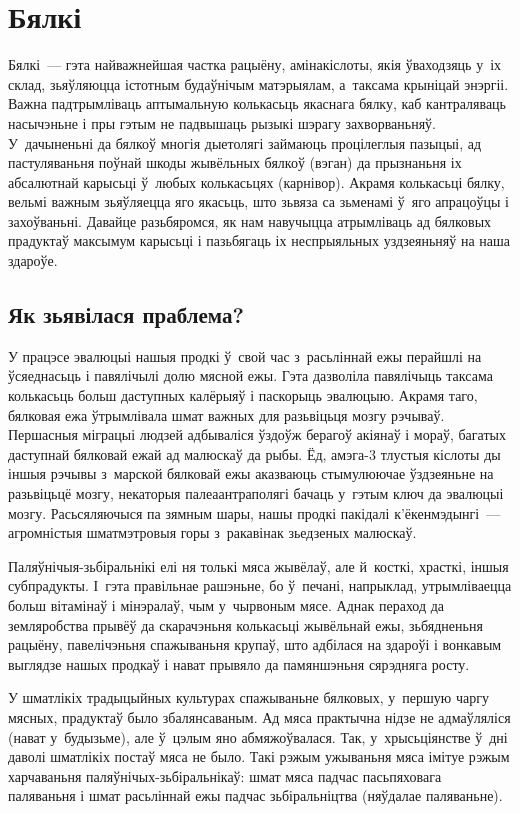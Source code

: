 \chapter{Бялкі}

Бялкі~--- гэта найважнейшая частка рацыёну, амінакіслоты, якія ўваходзяць у~іх склад, зьяўляюцца істотным будаўнічым матэрыялам, а~таксама крыніцай энэргіі. Важна падтрымліваць аптымальную колькасьць якаснага бялку, каб кантраляваць насычэньне і пры гэтым не падвышаць рызыкі шэрагу захворваньняў. У~дачыненьні да бялкоў многія дыетолягі займаюць процілеглыя пазыцыі, ад пастуляваньня поўнай шкоды жывёльных бялкоў (вэган) да прызнаньня іх абсалютнай карысьці ў~любых колькасьцях (карнівор). Акрамя колькасьці бялку, вельмі важным зьяўляецца яго якасьць, што зьвяза са зьменамі ў~яго апрацоўцы і захоўваньні. Давайце разьбяромся, як нам навучыцца атрымліваць ад бялковых прадуктаў максымум карысьці і пазьбягаць іх неспрыяльных уздзеяньняў на наша здароўе.

\section{Як зьявілася праблема?}

У працэсе эвалюцыі нашыя продкі ў~свой час з~расьліннай ежы перайшлі на ўсяеднасьць і павялічылі долю мясной ежы. Гэта дазволіла павялічыць таксама колькасьць больш даступных калёрыяў і паскорыць эвалюцыю. Акрамя таго, бялковая ежа ўтрымлівала шмат важных для разьвіцьця мозгу рэчываў. Першасныя міграцыі людзей адбываліся ўздоўж берагоў акіянаў і мораў, багатых даступнай бялковай ежай ад малюскаў да рыбы. Ёд, амэга-3 тлустыя кіслоты ды іншыя рэчывы з~марской бялковай ежы аказваюць стымулюючае ўздзеяньне на разьвіцьцё мозгу, некаторыя палеаантраполягі бачаць у~гэтым ключ да эвалюцыі мозгу. Расьсяляючыся па зямным шары, нашы продкі пакідалі к'ёкенмэдынгі~--- агромністыя шматмэтровыя горы з~ракавінак зьедзеных малюскаў.

Паляўнічыя-зьбіральнікі елі ня толькі мяса жывёлаў, але й~косткі, храсткі, іншыя субпрадукты. І~гэта правільнае рашэньне, бо ў~печані, напрыклад, утрымліваецца больш вітамінаў і мінэралаў, чым у~чырвоным мясе. Аднак пераход да земляробства прывёў да скарачэньня колькасьці жывёльнай ежы, зьбядненьня рацыёну, павелічэньня спажываньня крупаў, што адбілася на здароўі і вонкавым выглядзе нашых продкаў і нават прывяло да памяншэньня сярэдняга росту.

У шматлікіх традыцыйных культурах спажываньне бялковых, у~першую чаргу мясных, прадуктаў было збалянсаваным. Ад мяса практычна нідзе не адмаўляліся (нават у~будызьме), але ў~цэлым яно абмяжоўвалася. Так, у~хрысьціянстве ў~дні даволі шматлікіх постаў мяса не было. Такі рэжым ужываньня мяса імітуе рэжым харчаваньня паляўнічых-зьбіральнікаў: шмат мяса падчас пасьпяховага паляваньня і шмат расьліннай ежы падчас зьбіральніцтва (няўдалае паляваньне).

